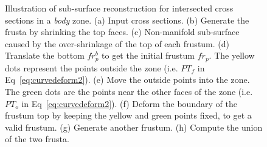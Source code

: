 \begin{figure} [htbp]
{\begin{minipage}[b]{0.23\textwidth}
    \end{minipage}}
  \caption{Illustration of sub-surface reconstruction for intersected cross sections in a \textit{body} zone.
  (a) Input cross sections.
  (b) Generate the frusta by shrinking the top faces.
  (c) Non-manifold sub-surface caused by the over-shrinkage of the top of each frustum.
  (d) Translate the bottom $fr_p^b$ to get the initial frustum $fr_p$. The yellow dots represent the points outside the zone (i.e. $PT_f$ in Eq~\ref{eq:curvedeform2}).
  (e) Move the outside points into the zone. The green dots are the points near the other faces of the zone (i.e. $PT_o$ in Eq~\ref{eq:curvedeform2}).
  (f) Deform the boundary of the frustum top by keeping the yellow and green points fixed, to get a valid frustum.
  (g) Generate another frustum.
  (h) Compute the union of the two frusta.}
  \label{fig:fruint}
\end{figure}

